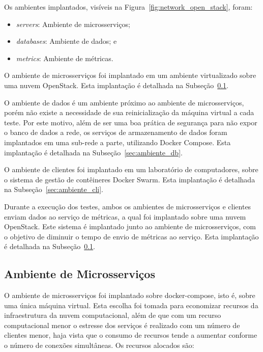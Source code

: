 Os ambientes implantados, visíveis na Figura~\ref{fig:network_open_stack}, foram:

\begin{itemize}
  \item \textit{servers}: Ambiente de microsserviços;
  \item \textit{databases}: Ambiente de dados; e
  \item \textit{metrics}: Ambiente de métricas.
\end{itemize}

O ambiente de microsserviços foi implantado em um ambiente virtualizado sobre uma nuvem OpenStack.
%
Esta implantação é detalhada na Subseção~\ref{sec:ambiente_mic}.

O ambiente de dados é um ambiente próximo ao ambiente de microsserviços, porém não existe a necessidade de sua reinicialização da máquina virtual a cada teste. Por este motivo, além de ser uma boa prática de segurança para não expor o banco de dados a rede, os serviços de armazenamento de dados foram implantados em uma sub-rede a parte, utilizando Docker Compose.
%
Esta implantação é detalhada na Subseção~\ref{sec:ambiente_db}.

O ambiente de clientes foi implantado em um laboratório de computadores, sobre o sistema de gestão de contêineres Docker Swarm.
%
Esta implantação é detalhada na Subseção~\ref{sec:ambiente_cli}.

Durante a execução dos testes, ambos os ambientes  de microsserviços e clientes enviam dados ao serviço de métricas, a qual foi implantado sobre uma nuvem OpenStack.
%
Este sistema é implantado junto ao ambiente de microsserviços, com o objetivo de diminuir o tempo de envio de métricas ao serviço.
%
Esta implantação é detalhada na Subseção~\ref{sec:ambiente_mic}.

\subsection{Ambiente de Microsserviços}
\label{sec:ambiente_mic}

O ambiente de microsserviços foi implantado sobre docker-compose, isto é, sobre uma única máquina virtual.
%
Esta escolha foi tomada para economizar recursos da infraestrutura da nuvem computacional, além de que com um recurso computacional menor o estresse dos serviços é realizado com um número de clientes menor, haja vista que o consumo de recursos tende a aumentar conforme o número de conexões simultâneas.
%
Os recursos alocados são:

